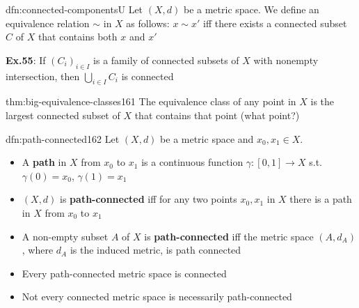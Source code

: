 \documentclass[landscape, 8pt]{extarticle}
\begin{document}
\begin{multicols}{3}
\begin{dfn}{dfn:connected-components}{U}
    Let $(X, d)$ be a metric space. We define an equivalence relation $\sim$ in $X$ as follows: $x \sim x'$ iff there exists a connected subset $C$ of $X$ that contains both $x$ and $x'$

    \longrule{0.08ex}
    \textbf{Ex.55}: If $(C_{i})_{i\in I}$ is a family of connected subsets of $X$ with nonempty intersection, then $\bigcup_{i\in I} C_{i}$ is connected
\end{dfn}

\begin{thm}{thm:big-equivalence-classes}{161}
    \vspace{-5pt}
    The equivalence class of any point in $X$ is the largest connected subset of $X$ that contains that point (what point?)
\end{thm}

\begin{dfn}{dfn:path-connected}{162}
    \vspace{-5pt}
    Let $(X, d)$ be a metric space and $x_{0}, x_{1}\in X$. 

    \vspace{-5pt}
    \begin{itemize}[leftmargin=*]
        \item A \textbf{path} in $X$ from $x_{0}$ to $x_{1}$ is a continuous function $\gamma : [0, 1] \to X$ s.t. $\gamma(0) = x_{0}$, $\gamma(1) = x_{1}$
        \item $(X, d)$ is \textbf{path-connected} iff for any two points $x_{0}, x_{1}$ in $X$ there is a path in $X$ from $x_{0}$ to $x_{1}$
        \item A non-empty subset $A$ of $X$ is \textbf{path-connected} iff the metric space $(A, d_{A})$, where $d_{A}$ is the induced metric, is path connected
    \end{itemize}

    \vspace{-5pt}
    \vspace{-5pt}
    \begin{itemize}[leftmargin=*]
        \item Every path-connected metric space is connected
        \item Not every connected metric space is necessarily path-connected
    \end{itemize}
\end{dfn}


\end{multicols}
\end{document}
